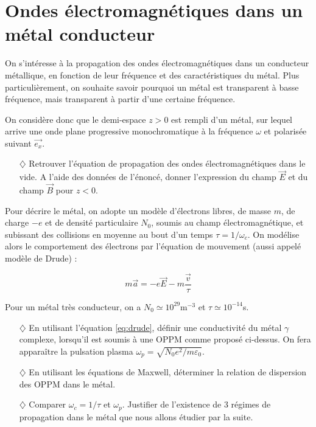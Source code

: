 \documentclass{report}
\begin{document}
\newpage

\section*{Ondes électromagnétiques dans un métal conducteur}

On s'intéresse à la propagation des ondes électromagnétiques dans un conducteur métallique, en fonction de leur fréquence et des caractéristiques du métal. Plus particulièrement, on souhaite savoir pourquoi un métal est transparent à basse fréquence, mais transparent à partir d'une certaine fréquence.

On considère donc que le demi-espace $z>0$ est rempli d'un métal, sur lequel arrive une onde plane progressive monochromatique à la fréquence $\omega$ et polarisée suivant $\vec{e_x}$. 

\begin{itemize}

	\item[$\diamondsuit$] Retrouver l'équation de propagation des ondes électromagnétiques dans le vide. A l'aide des données de l'énoncé, donner l'expression du champ $\vec{E}$ et du champ $\vec{B}$ pour $z<0$.

\end{itemize}

Pour décrire le métal, on adopte un modèle d'électrons libres, de masse $m$, de charge $-e$ et de densité particulaire $N_0$, soumis au champ électromagnétique, et subissant des collisions en moyenne au bout d'un temps $\tau=1/\omega_c$. On modélise alors le comportement des électrons par l'équation de mouvement (aussi appelé modèle de Drude) :

\begin{equation}
	m\vec{a}=-e\vec{E}-m\frac{\vec{v}}{\tau}
	\label{eq:drude}
\end{equation}

Pour un métal très conducteur, on a $N_0\simeq10^{29}$m$^{-3}$ et $\tau\simeq10^{-14}$s.

\begin{itemize}

	\item[$\diamondsuit$] En utilisant l'équation \ref{eq:drude}, définir une conductivité du métal $\gamma$ complexe, lorsqu'il est soumis à une OPPM comme proposé ci-dessus. On fera apparaître la pulsation plasma $\omega_p=\sqrt{N_0e^2/m\varepsilon_0}$. 
	
	\item[$\diamondsuit$] En utilisant les équations de Maxwell, déterminer la relation de dispersion des OPPM dans le métal. 
	
	\item[$\diamondsuit$] Comparer $\omega_c=1/\tau$ et $\omega_p$. Justifier de l'existence de 3 régimes de propagation dans le métal que nous allons étudier par la suite.

\end{itemize}
\end{document}
